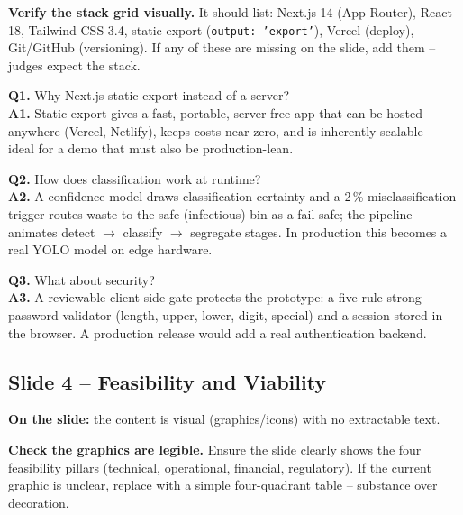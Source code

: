 \documentclass[11pt, a4paper]{article}
\begin{document}
\begin{flagbox}
\textbf{Verify the stack grid visually.} It should list: Next.js 14 (App
Router), React 18, Tailwind CSS 3.4, static export
(\texttt{output: 'export'}), Vercel (deploy), Git/GitHub (versioning). If any
of these are missing on the slide, add them -- judges expect the stack.
\end{flagbox}

\begin{qabox}
\textbf{Q1.} Why Next.js static export instead of a server?\\
\textbf{A1.} Static export gives a fast, portable, server-free app that can be
hosted anywhere (Vercel, Netlify), keeps costs near zero, and is inherently
scalable -- ideal for a demo that must also be production-lean.

\textbf{Q2.} How does classification work at runtime?\\
\textbf{A2.} A confidence model draws classification certainty and a 2\,\%
misclassification trigger routes waste to the safe (infectious) bin as a
fail-safe; the pipeline animates detect $\rightarrow$ classify $\rightarrow$
segregate stages. In production this becomes a real YOLO model on edge
hardware.

\textbf{Q3.} What about security?\\
\textbf{A3.} A reviewable client-side gate protects the prototype: a
five-rule strong-password validator (length, upper, lower, digit, special)
and a session stored in the browser. A production release would add a
real authentication backend.
\end{qabox}

\subsection{Slide 4 -- Feasibility and Viability}
\textbf{On the slide:} the content is visual (graphics/icons) with no
extractable text.
\begin{flagbox}
\textbf{Check the graphics are legible.} Ensure the slide clearly shows the
four feasibility pillars (technical, operational, financial, regulatory).
If the current graphic is unclear, replace with a simple four-quadrant table
-- substance over decoration.
\end{flagbox}
\end{document}
